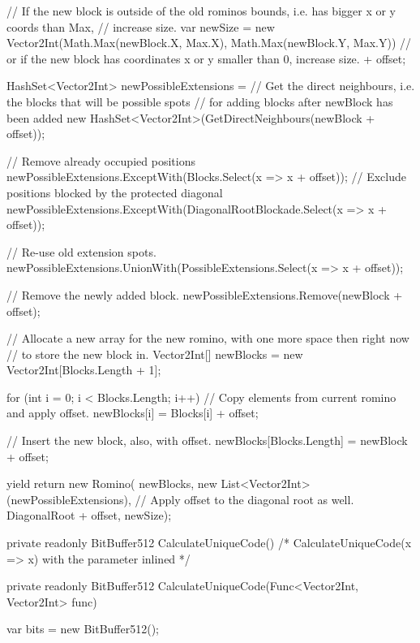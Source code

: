 \documentclass[a4paper,10pt,ngerman]{scrartcl}
\begin{document}
\begin{lstcs}
{{{            // If the new block is outside of the old rominos bounds, i.e. has bigger x or y coords than Max,
            // increase size.
            var newSize = new Vector2Int(Math.Max(newBlock.X, Max.X), Math.Max(newBlock.Y, Max.Y))
                // or if the new block has coordinates x or y smaller than 0, increase size.
                + offset;

            HashSet<Vector2Int> newPossibleExtensions =
                // Get the direct neighbours, i.e. the blocks that will be possible spots
                // for adding blocks after newBlock has been added
                new HashSet<Vector2Int>(GetDirectNeighbours(newBlock + offset));

            // Remove already occupied positions
            newPossibleExtensions.ExceptWith(Blocks.Select(x => x + offset));
            // Exclude positions blocked by the protected diagonal
            newPossibleExtensions.ExceptWith(DiagonalRootBlockade.Select(x => x + offset));

            // Re-use old extension spots.
            newPossibleExtensions.UnionWith(PossibleExtensions.Select(x => x + offset));

            // Remove the newly added block.
            newPossibleExtensions.Remove(newBlock + offset);

            // Allocate a new array for the new romino, with one more space then right now
            // to store the new block in.
            Vector2Int[] newBlocks = new Vector2Int[Blocks.Length + 1];

            for (int i = 0; i < Blocks.Length; i++)
            {
                // Copy elements from current romino and apply offset.
                newBlocks[i] = Blocks[i] + offset;
            }

            // Insert the new block, also, with offset.
            newBlocks[Blocks.Length] = newBlock + offset;

            yield return new Romino(
                newBlocks,
                new List<Vector2Int>(newPossibleExtensions),
                // Apply offset to the diagonal root as well.
                DiagonalRoot + offset,
                newSize);
        }
    }

    private readonly BitBuffer512 CalculateUniqueCode()
    { /* CalculateUniqueCode(x => x) with the parameter inlined */ }

    private readonly BitBuffer512 CalculateUniqueCode(Func<Vector2Int, Vector2Int> func)
    {
        var bits = new BitBuffer512();

}}
\end{lstcs}
\end{document}
